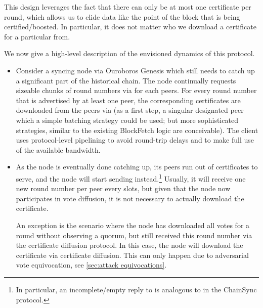 This design leverages the fact that there can only be at most one certificate per round, which allows us to elide data like the point of the block that is being certified/boosted.
In particular, it does not matter who we download a certificate for a particular from.

We now give a high-level description of the envisioned dynamics of this protocol.

\begin{itemize}
\item
  Consider a syncing node via Ouroboros Genesis which still needs to catch up a significant part of the historical chain.
  The node continually requests sizeable chunks of round numbers via  for each peers.
  For every round number that is advertised by at least one peer, the corresponding certificates are downloaded from the peers via  (as a first step, a singular designated peer which a simple batching strategy could be used; but more sophisticated strategies, similar to the existing BlockFetch logic are conceivable).
  The client uses protocol-level pipelining to avoid round-trip delays and to make full use of the available bandwidth.
\item
  As the node is eventually done catching up, its peers run out of certificates to serve, and the node will start sending  instead.\footnote{
  In particular, an incomplete/empty reply to  is analogous to  in the ChainSync protocol.}
  Usually, it will receive one new round number per peer every \perasRoundSlots{} slots, but given that the node now participates in vote diffusion, it is not necessary to actually download the certificate.

  An exception is the scenario where the node has downloaded all votes for a round without observing a quorum, but still received this round number via the certificate diffusion protocol.
  In this case, the node will download the certificate via certificate diffusion.
  This can only happen due to adversarial vote equivocation, see \cref{sec:attack equivocations}.
\end{itemize}

